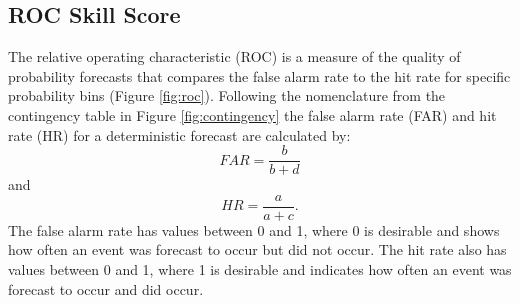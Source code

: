 \documentclass[11pt,twoside,a4paper,fleqn,x11names]{report}
\numberwithin{equation}{chapter}
\numberwithin{figure}{chapter}
\numberwithin{table}{chapter}
\begin{document}
\subsection{ROC Skill Score}
The relative operating characteristic (ROC) is a measure of the quality of probability forecasts that compares the false alarm rate to the hit rate for specific probability bins (Figure \ref{fig:roc}). Following the nomenclature from the contingency table in Figure \ref{fig:contingency} the false alarm rate (FAR) and hit rate (HR) for a deterministic forecast are calculated by:
\begin{equation}
	FAR = \frac{b}{b + d}
	\label{eq:FAR}
\end{equation}
and
\begin{equation}
	HR = \frac{a}{a + c}.
	\label{eq:HR}
\end{equation}
The false alarm rate has values between 0 and 1, where 0 is desirable and shows how often an event was forecast to occur but did not occur. The hit rate also has values between 0 and 1, where 1 is desirable and indicates how often an event was forecast to occur and did occur.
\end{document}
